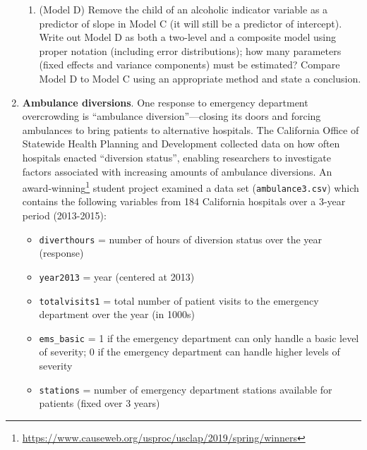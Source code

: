 \documentclass[
]{krantz}
\providecommand{\tightlist}{%
  \setlength{\itemsep}{0pt}\setlength{\parskip}{0pt}}
\renewcommand{\href}[2]{#2\footnote{\url{#1}}}
\begin{document}
\begin{enumerate}
\begin{enumerate}
  \item
    (Model D) Remove the child of an alcoholic indicator variable as a predictor of slope in Model C (it will still be a predictor of intercept). Write out Model D as both a two-level and a composite model using proper notation (including error distributions); how many parameters (fixed effects and variance components) must be estimated? Compare Model D to Model C using an appropriate method and state a conclusion.
  \end{enumerate}
\item
  \textbf{Ambulance diversions}. One response to emergency department overcrowding is ``ambulance diversion''---closing its doors and forcing ambulances to bring patients to alternative hospitals. The California Office of Statewide Health Planning and Development collected data on how often hospitals enacted ``diversion status'', enabling researchers to investigate factors associated with increasing amounts of ambulance diversions. An \href{https://www.causeweb.org/usproc/usclap/2019/spring/winners}{award-winning} student project \citep{Radtke2019} examined a data set (\texttt{ambulance3.csv}) which contains the following variables from 184 California hospitals over a 3-year period (2013-2015):

  \begin{itemize}
  \tightlist
  \item
    \texttt{diverthours} = number of hours of diversion status over the year (response)
  \item
    \texttt{year2013} = year (centered at 2013)
  \item
    \texttt{totalvisits1} = total number of patient visits to the emergency department over the year (in 1000s)
  \item
    \texttt{ems\_basic} = 1 if the emergency department can only handle a basic level of severity; 0 if the emergency department can handle higher levels of severity
  \item
    \texttt{stations} = number of emergency department stations available for patients (fixed over 3 years)
  \end{itemize}


\end{enumerate}
\end{document}
